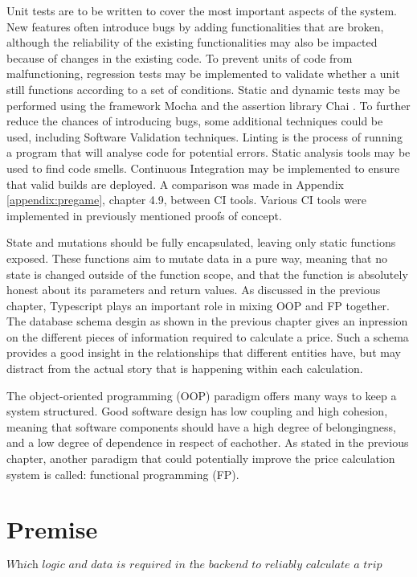 Unit tests are to be written to cover the most important aspects of the system. New features often introduce bugs by adding functionalities that are broken, although the reliability of the existing functionalities may also be impacted because of changes in the existing code. To prevent units of code from malfunctioning, regression tests may be implemented to validate whether a unit still functions according to a set of conditions. Static and dynamic tests may be performed using the framework Mocha \cite{mocha} and the assertion library Chai \cite{chai}. To further reduce the chances of introducing bugs, some additional techniques could be used, including Software Validation techniques. Linting is the process of running a program that will analyse code for potential errors. Static analysis tools may be used to find code smells. Continuous Integration may be implemented to ensure that valid builds are deployed. A comparison was made in Appendix \ref{appendix:pregame}, chapter 4.9, between CI tools. Various CI tools were implemented in previously mentioned proofs of concept.

State and mutations should be fully encapsulated, leaving only static functions exposed. These functions aim to mutate data in a pure way, meaning that no state is changed outside of the function scope, and that the function is absolutely honest about its parameters and return values. As discussed in the previous chapter, Typescript plays an important role in mixing OOP and FP together. The database schema desgin as shown in the previous chapter gives an inpression on the different pieces of information required to calculate a price. Such a schema provides a good insight in the relationships that different entities have, but may distract from the actual story that is happening within each calculation.

The object-oriented programming (OOP) paradigm offers many ways to keep a system structured. Good software design has low coupling and high cohesion, meaning that software components should have a high degree of belongingness, and a low degree of dependence in respect of eachother. As stated in the previous chapter, another paradigm that could potentially improve the price calculation system is called: functional programming (FP).


\section{Premise}
\[\textit{Which logic and data is required in the backend to reliably calculate a trip price?}\]\hfill

